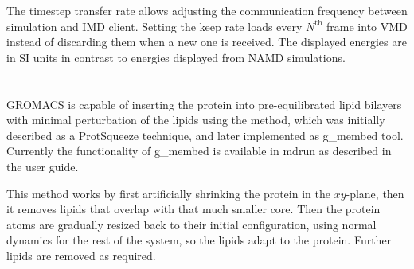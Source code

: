 The timestep transfer rate allows adjusting the communication frequency between simulation
and IMD client. Setting the keep rate loads every $N^\mathrm{th}$ frame into VMD instead
of discarding them when a new one is received. The displayed energies are in SI units
in contrast to energies displayed from NAMD simulations.

\section{}
\label{sec:membed}

GROMACS is capable of inserting the protein into pre-equilibrated
lipid bilayers with minimal perturbation of the lipids using the
method, which was initially described as a ProtSqueeze
technique,\cite{Yesylevskyy2007} and later implemented as g\_membed
tool.\cite{Wolf2010} Currently the functionality of g\_membed is
available in mdrun as described in the user guide.

This method works by first artificially shrinking the protein in the
$xy$-plane, then it removes lipids that overlap with that much smaller
core. Then the protein atoms are gradually resized back to their
initial configuration, using normal dynamics for the rest of the
system, so the lipids adapt to the protein. Further lipids are removed
as required.


